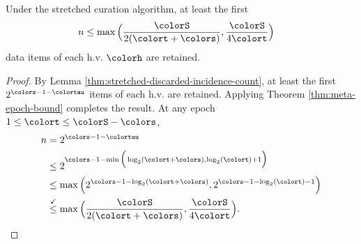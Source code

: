 \begin{theorem}
\label{thm:stretched-reservation-count}
Under the stretched curation algorithm, at least the first
\begin{align*}
n &\leq
\max\Big(
  \frac{\colorS}{2(\colort + \colors)},
  \frac{\colorS}{4\colort}
\Big)
\end{align*}
data items of each h.v. $\colorh$ are retained.
\end{theorem}
\begin{proof}

By Lemma \ref{thm:stretched-discarded-incidence-count}, at least the first $2^{\colors - 1 - \colortau}$ items of each h.v. are retained.
Applying Theorem \ref{thm:meta-epoch-bound} completes the result.
At any epoch $1 \leq \colort \leq \colorS - \colors$,
\begin{align*}
n
&= 2^{\colors - 1 - \colortau}\\
&\leq2^{\colors - 1 - \min\Big(
  \log_2(\colort + \colors),
  \log_2(\colort) + 1
\Big)}\\
&\leq \max\Big(
  2^{\colors - 1 - \log_2(\colort + \colors)},
  2^{\colors - 1 - \log_2(\colort) - 1}
\Big)\\
&\stackrel{\checkmark}{\leq} \max\Big(
  \frac{\colorS}{2(\colort + \colors)},
  \frac{\colorS}{4\colort}
\Big).
\end{align*}

\end{proof}
